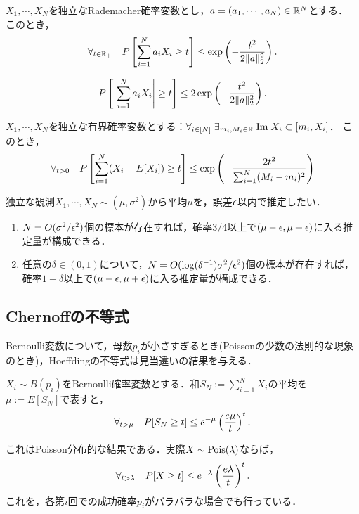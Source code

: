 \documentclass[uplatex,dvipdfmx]{jsreport}
\begin{document}
\begin{theorem}
    $X_1,\cdots,X_N$を独立なRademacher確率変数とし，$a=(a_1,\cdots,a_N)\in\mathbb{R}^N$とする．
    このとき，
    \[\forall_{t\in\mathbb{R}_+}\quad P\left[\sum^N_{i=1}a_iX_i\ge t\right]\le\exp\left(-\frac{t^2}{2\|a\|^2_2}\right).\]
\end{theorem}
\begin{corollary}
    \[P\left[\left|\sum^N_{i=1}a_iX_i\right|\ge t\right]\le 2\exp\left(-\frac{t^2}{2\|a\|^2_2}\right).\]
\end{corollary}

\begin{theorem}
    $X_1,\cdots,X_N$を独立な有界確率変数とする：$\forall_{i\in[N]}\;\exists_{m_i,M_i\in\mathbb{R}}\;\mathrm{Im}\; X_i\subset[m_i,X_i]$．
    このとき，
    \[\forall_{t>0}\quad P\left[\sum^N_{i=1}(X_i-E[X_i])\ge t\right]\le\exp\left(-\frac{2t^2}{\sum_{i=1}^N(M_i-m_i)^2}\right)\]
\end{theorem}

\begin{application}[平均の頑健推定]
    独立な観測$X_1,\cdots,X_N\sim(\mu,\sigma^2)$から平均$\mu$を，誤差$\epsilon$以内で推定したい．
    \begin{enumerate}
        \item $N=O(\sigma^2/\epsilon^2)$個の標本が存在すれば，確率$3/4$以上で$(\mu-\epsilon,\mu+\epsilon)$に入る推定量が構成できる．
        \item 任意の$\delta\in(0,1)$について，$N=O(\log(\delta^{-1})\sigma^2/\epsilon^2)$個の標本が存在すれば，確率$1-\delta$以上で$(\mu-\epsilon,\mu+\epsilon)$に入る推定量が構成できる．
    \end{enumerate}
\end{application}

\subsection{Chernoffの不等式}

\begin{tcolorbox}[colframe=ForestGreen, colback=ForestGreen!10!white,breakable,colbacktitle=ForestGreen!40!white,coltitle=black,fonttitle=\bfseries\sffamily,
title=]
    Bernoulli変数について，母数$p_i$が小さすぎるとき(Poissonの少数の法則的な現象のとき)，Hoeffdingの不等式は見当違いの結果を与える．
\end{tcolorbox}

\begin{theorem}
    $X_i\sim B(p_i)$をBernoulli確率変数とする．和$S_N:=\sum_{i=1}^NX_i$の平均を$\mu:=E[S_N]$で表すと，
    \[\forall_{t>\mu}\quad P[S_N\ge t]\le e^{-\mu}\left(\frac{e\mu}{t}\right)^t.\]
\end{theorem}
\begin{remarks}
    これはPoisson分布的な結果である．実際$X\sim\mathrm{Pois}(\lambda)$ならば，
    \[\forall_{t>\lambda}\quad P[X\ge t]\le e^{-\lambda}\left(\frac{e\lambda}{t}\right)^t.\]
    これを，各第$i$回での成功確率$p_i$がバラバラな場合でも行っている．
\end{remarks}
\end{document}
